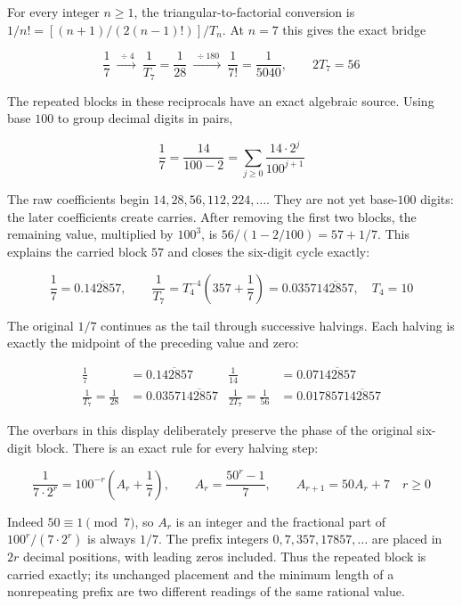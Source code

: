\documentclass[
  11pt,
]{book}
\begin{document}
For every integer \(n\ge1\), the triangular-to-factorial conversion is
\(1/n!=[(n+1)/(2(n-1)!)]/T_n\). At \(n=7\) this gives the exact bridge

\[
\boxed{\frac17\ \xrightarrow{\ \div4\ }\ \frac1{T_7}=\frac1{28}
\ \xrightarrow{\ \div180\ }\ \frac1{7!}=\frac1{5040},\qquad
2T_7=56}
\tag{4A.1a}
\]

The repeated blocks in these reciprocals have an exact algebraic source.
Using base \(100\) to group decimal digits in pairs,

\[
\boxed{\frac17=\frac{14}{100-2}
=\sum_{j\ge0}\frac{14\cdot2^j}{100^{j+1}}}
\tag{4A.2}
\]

The raw coefficients begin \(14,28,56,112,224,\ldots\). They are not yet
base-\(100\) digits: the later coefficients create carries. After
removing the first two blocks, the remaining value, multiplied by
\(100^3\), is \(56/(1-2/100)=57+1/7\). This explains the carried block
\(57\) and closes the six-digit cycle exactly:

\[
\frac17=0.\overline{142857},\qquad
\boxed{\frac1{T_7}=T_4^{-4}\left(357+\frac17\right)
=0.0357\overline{142857},\quad T_4=10}
\tag{4A.3}
\]

The original \(1/7\) continues as the tail through successive halvings.
Each halving is exactly the midpoint of the preceding value and zero:

\[
\boxed{\begin{aligned}
\frac17&=0.\overline{142857}
&\frac1{14}&=0.07\overline{142857}\\
\frac1{T_7}=\frac1{28}&=0.0357\overline{142857}
&\frac1{2T_7}=\frac1{56}&=0.017857\overline{142857}
\end{aligned}}
\tag{4A.3a}
\]

The overbars in this display deliberately preserve the phase of the
original six-digit block. There is an exact rule for every halving step:

\[
\frac1{7\cdot2^r}=100^{-r}\left(A_r+\frac17\right),\qquad
A_r=\frac{50^r-1}{7},\qquad A_{r+1}=50A_r+7
\quad r\ge0
\tag{4A.3b}
\]

Indeed \(50\equiv1\pmod7\), so \(A_r\) is an integer and the fractional
part of \(100^r/(7\cdot2^r)\) is always \(1/7\). The prefix integers
\(0,7,357,17857,\ldots\) are placed in \(2r\) decimal positions, with
leading zeros included. Thus the repeated block is carried exactly; its
unchanged placement and the minimum length of a nonrepeating prefix are
two different readings of the same rational value.

\end{document}
